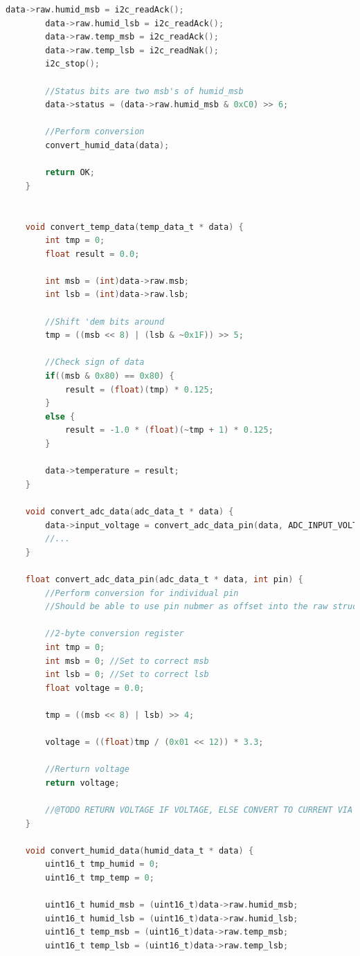 \documentclass{article}
\numberwithin{figure}{section}
\numberwithin{equation}{section}
\begin{document}
{\begin{lstlisting}[language=C,label=lst:rfcx-i2c.c,caption=rfcx-i2c.c]
        data->raw.humid_msb = i2c_readAck();
        data->raw.humid_lsb = i2c_readAck();
        data->raw.temp_msb = i2c_readAck();
        data->raw.temp_lsb = i2c_readNak();
        i2c_stop();

        //Status bits are two msb's of humid_msb
        data->status = (data->raw.humid_msb & 0xC0) >> 6;

        //Perform conversion
        convert_humid_data(data);

        return OK;
    }


    void convert_temp_data(temp_data_t * data) {
        int tmp = 0;
        float result = 0.0;

        int msb = (int)data->raw.msb;
        int lsb = (int)data->raw.lsb;

        //Shift 'dem bits around
        tmp = ((msb << 8) | (lsb & ~0x1F)) >> 5;

        //Check sign of data
        if((msb & 0x80) == 0x80) {
            result = (float)(tmp) * 0.125;
        }
        else {
            result = -1.0 * (float)(~tmp + 1) * 0.125;
        }

        data->temperature = result;
    }

    void convert_adc_data(adc_data_t * data) {
        data->input_voltage = convert_adc_data_pin(data, ADC_INPUT_VOLTAGE_PIN);
        //...
    }

    float convert_adc_data_pin(adc_data_t * data, int pin) {
        //Perform conversion for individual pin
        //Should be able to use pin nubmer as offset into the raw struct to make this easier

        //2-byte conversion register
        int tmp = 0;
        int msb = 0; //Set to correct msb
        int lsb = 0; //Set to correct lsb
        float voltage = 0.0;

        tmp = ((msb << 8) | lsb) >> 4;

        voltage = ((float)tmp / (0x01 << 12)) * 3.3;

        //Rerturn voltage
        return voltage;

        //@TODO RETURN VOLTAGE IF VOLTAGE, ELSE CONVERT TO CURRENT VIA ANOTHER FUNCTION
    }

    void convert_humid_data(humid_data_t * data) {
        uint16_t tmp_humid = 0;
        uint16_t tmp_temp = 0;

        uint16_t humid_msb = (uint16_t)data->raw.humid_msb;
        uint16_t humid_lsb = (uint16_t)data->raw.humid_lsb;
        uint16_t temp_msb = (uint16_t)data->raw.temp_msb;
        uint16_t temp_lsb = (uint16_t)data->raw.temp_lsb;


\end{lstlisting}}
\end{document}
